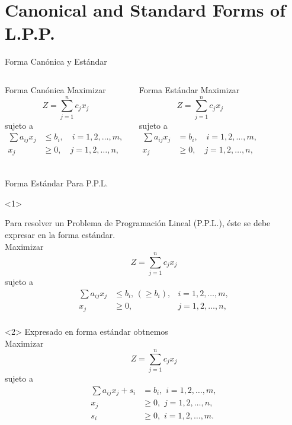 
\section{Canonical and Standard Forms of L.P.P.}
\label{sec:canonical-standard-form}

\begin{frame}{Forma Canónica y Estándar}
  \begin{columns}
      \begin{block}{Forma Canónica}
  Maximizar \[ Z = \sum_{j=1}^{n} c_j x_j\] 
  sujeto a
  \begin{align*}
    \sum a_{ij}x_j  & \leq b_i, \quad i = 1, 2, \ldots, m,\\
    x_j  & \geq 0, \quad j = 1, 2, \ldots, n,\\
  \end{align*}  
\end{block}
\begin{block}{Forma Estándar}
    Maximizar \[ Z = \sum_{j=1}^{n} c_j x_j\] 
  sujeto a
  \begin{align*}
    \sum a_{ij}x_j  & = b_i, \quad i = 1, 2, \ldots, m,\\
    x_j  & \geq 0, \quad j = 1, 2, \ldots, n,\\
  \end{align*}
\end{block}
  \end{columns}
\end{frame}


\begin{frame}{Forma Estándar Para P.P.L.}
  \begin{onlyenv}<1>
    
    Para resolver un Problema de Programación Lineal (P.P.L.), éste se debe expresar en la forma estándar.\\

    Maximizar \[ Z = \sum_{j=1}^{n} c_j x_j\] 
  sujeto a
  \begin{align*}
    \sum a_{ij}x_j  & \leq  b_i, \, (\geq b_i), & i = 1, 2, \ldots, m,\\
    x_j  & \geq 0, & j = 1, 2, \ldots, n,\\
  \end{align*}
\end{onlyenv}
\begin{onlyenv}<2>
  Expresado en forma estándar obtnemos\\

  Maximizar \[ Z = \sum_{j=1}^{n} c_j x_j\] 
  sujeto a
  \begin{align*}
    \sum a_{ij}x_j + s_i & =  b_i,  \,\, i = 1, 2, \ldots, m,\\
    x_j  & \geq 0, \, \, j = 1, 2, \ldots, n,\\
    s_i  & \geq 0, \, \, i = 1, 2, \ldots, m.\\
  \end{align*}
\end{onlyenv}
\end{frame}


